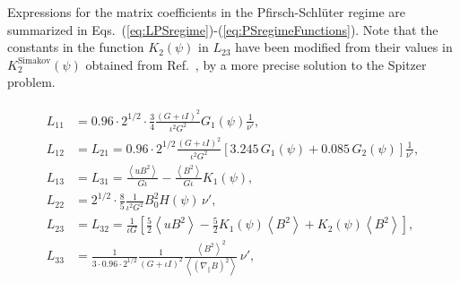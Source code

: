 \documentclass[12pt]{revtex4}
\begin{document}
Expressions for the matrix coefficients in the Pfirsch-Schl{\"u}ter regime are summarized in Eqs.~(\ref{eq:LPSregime})-(\ref{eq:PSregimeFunctions}). 
Note that the constants in the function ${K}_2 \left(\psi\right)$ in $L_{23}$ have been modified from their values in ${K}_{2}^{\mathrm{Simakov}} \left(\psi\right)$ obtained from Ref.~\cite{AndreiPer2009}, by a more precise solution to the Spitzer problem.


\begin{align}
\begin{split}
L_{11} & = 
 0.96 \cdot 2^{1/2} \cdot  \frac{3}{4}  \frac{\left(G + \iota I\right)^2}{ \iota^2 G^2} 
 {G}_1 \left(\psi\right) \frac{1}{\nu'},\\
L_{12} & = L_{21} =  0.96 \cdot 2^{1/2} \frac{\left({G} + \iota {I}\right)^2}{ \iota^2 {G}^2} \left[ 3.245 \, {G}_1 \left(\psi\right) + 0.085 \, {G}_2 \left(\psi\right)  \right] \frac{1}{\nu'}, \\
L_{13} & = L_{31}  = \frac{\left\langle {u} {B}^2  \right\rangle}{{G} \iota} - \frac{\left\langle {B}^2\right\rangle}{{G} \iota} {K}_1\left(\psi\right), \\
L_{22} & = 2^{1/2} \cdot  \frac{8}{5} \frac{1}{\iota^2 {G}^2} B_0^2 {H} \left(\psi\right) \, \nu', \\
L_{23} & = L_{32} = \frac{1}{\iota {G}} \left[\frac{5}{2} \left\langle {u} {B}^2  \right\rangle - \frac{5}{2} {K}_1\left(\psi\right) \left\langle {B}^2\right\rangle + {K}_2\left(\psi\right) \left\langle {B}^2\right\rangle\right], \\
L_{33} & = \frac{1}{3 \cdot 0.96 \cdot 2^{1/2}} \frac{1}{\left({G} + \iota {I}\right)^2} \frac{\left\langle {B}^2\right\rangle^2}{\left\langle \left( {\nabla}_\| {B}\right)^2\right\rangle} \, \nu',	
\label{eq:LPSregime}
\end{split}
\end{align}
\end{document}
